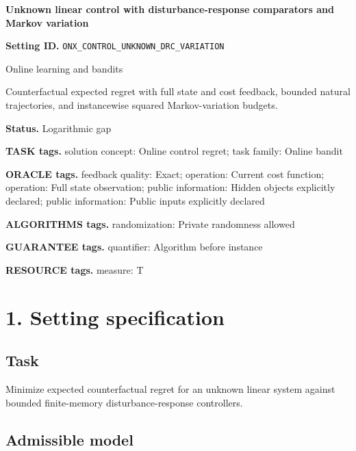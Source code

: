 \documentclass[10pt,a4paper]{article}
\begin{document}
\raggedright

{\LARGE\bfseries\sffamily\color{AtlasNavy} Unknown linear control with disturbance-response comparators and Markov variation\par}\vspace{5pt}


\textbf{Setting ID.} \texttt{ONX\_\allowbreak{}CONTROL\_\allowbreak{}UNKNOWN\_\allowbreak{}DRC\_\allowbreak{}VARIATION}



Online learning and bandits



Counterfactual expected regret with full state and cost feedback, bounded natural trajectories, and instancewise squared Markov-variation budgets.



\textbf{Status.} Logarithmic gap



\textbf{TASK tags.} solution concept: Online control regret; task family: Online bandit



\textbf{ORACLE tags.} feedback quality: Exact; operation: Current cost function; operation: Full state observation; public information: Hidden objects explicitly declared; public information: Public inputs explicitly declared



\textbf{ALGORITHMS tags.} randomization: Private randomness allowed



\textbf{GUARANTEE tags.} quantifier: Algorithm before instance



\textbf{RESOURCE tags.} measure: T



\section{1. Setting specification}


\subsection{Task}


Minimize expected counterfactual regret for an unknown linear system against bounded finite-memory disturbance-response controllers.



\subsection{Admissible model}
\end{document}
